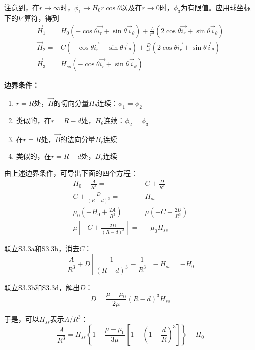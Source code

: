 注意到，在$r\rightarrow \infty$时，$\phi_1 \rightarrow H_0 r\cos\theta$以及在$r\rightarrow 0$时，$\phi_3$为有限值。应用球坐标下的$\nabla$算符，得到
\begin{align}
  \vec{H}_1 =& H_0 (-\cos\theta\vec{i_r}+\sin\theta\vec{i}_\theta)+\frac{A}{r^3} (2\cos\theta\vec{i_r}+\sin\theta\vec{i}_\theta) \tag{S3.2a}\\
  \vec{H}_2 =& C(-\cos\theta\vec{i_r}+\sin\theta\vec{i}_\theta)+\frac{D}{r^3} (2\cos\theta\vec{i_r}+\sin\theta\vec{i}_\theta)  \tag{S3.2b}\\
   \vec{H}_3 =& H_{ss}  (-\cos\theta\vec{i_r}+\sin\theta\vec{i}_\theta)  \tag{S3.2c}
\end{align}

\textbf{边界条件：}

\begin{enumerate}
  \item $r=R$处，$\vec{H}$的切向分量$H_\theta$连续：$\phi_1=\phi_2   $
  \item 类似的，在$r=R-d$处，$H_\theta$连续：$\phi_2=\phi_3  $
  \item 在$r=R$处，$\vec{B}$的法向分量$B_r$连续
  \item 类似的，在$r=R-d$处，$B_r$连续
\end{enumerate}

由上述边界条件，可导出下面的四个方程：
\begin{align}
  H_0+\frac{A}{R^3}=& C+\frac{D}{R^3} \nonumber \tag{S3.3a}\\
  C+\frac{D}{(R-d)^3}=& H_{ss} \nonumber \tag{S3.3b}\\
  \mu_0(-H_0+\frac{2A}{R^3})=& \mu\left(-C+\frac{2D}{R^3}\right)\nonumber \tag{S3.3c} \\
  \mu\left[-C+\frac{2D}{(R-d)^3}\right]=& -\mu_0 H_{ss} \nonumber\tag{S3.3d}
\end{align}

联立S3.3a和S3.3b，消去$C$：
\begin{equation*}
\frac{A}{R^3}+D\left[\frac{1}{(R-d)^3}-\frac{1}{R^3}\right]-H_{ss} =-H_0 \tag{S3.4}
\end{equation*}


联立S3.3b和S3.3d，解出$D$：
\begin{equation*}
D=\frac{\mu-\mu_0}{2\mu} (R-d)^3 H_{ss}  \tag{S3.5}
\end{equation*}

于是，可以$H_{ss}$表示$A/R^3$：
\begin{equation*}
\frac{A}{R^3}=H_{ss}\left\{1-\frac{\mu-\mu_0}{3\mu}\left[1-\left(1-\frac{d}{R}\right)^3\right]\right\}-H_0   \tag{S3.6}
\end{equation*}

